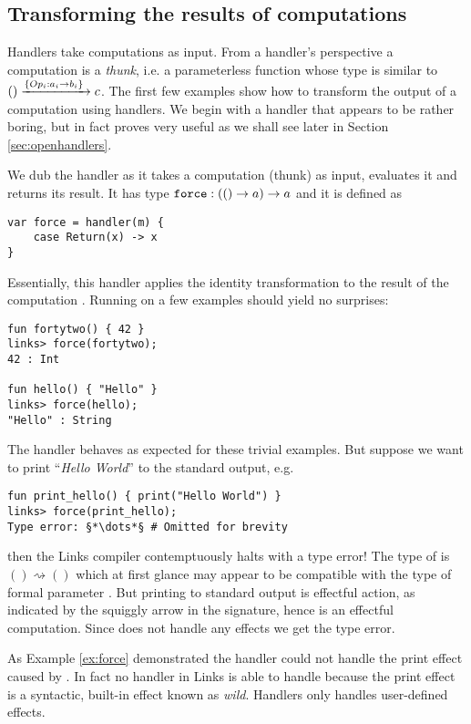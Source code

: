\subsection{Transforming the results of computations}\label{sec:transform}
Handlers take computations as input. From a handler's perspective a computation is a \emph{thunk}, i.e. a parameterless function whose type is similar to $() \xrightarrow{\left\{Op_i:a_i \to b_i \right\}\;} c$. The first few examples show how to transform the output of a computation using handlers. We begin with a handler that appears to be rather boring, but in fact proves very useful as we shall see later in Section \ref{sec:openhandlers}.
\begin{example}\label{ex:force}
We dub the handler  as it takes a computation (thunk) as input, evaluates it and returns its result. It has type $\texttt{force} : (() \to a) \to a$ and it is defined as
\begin{lstlisting}[style=links]
var force = handler(m) {
    case Return(x) -> x
}
\end{lstlisting}
Essentially, this handler applies the identity transformation to the result of the computation . Running  on a few examples should yield no surprises:
\begin{lstlisting}[style=links]
fun fortytwo() { 42 }
links> force(fortytwo);
42 : Int

fun hello() { "Hello" }
links> force(hello);
"Hello" : String
\end{lstlisting}
The handler  behaves as expected for these trivial examples. But suppose we want to print ``\emph{Hello World}'' to the standard output, e.g.
\begin{lstlisting}
fun print_hello() { print("Hello World") }
links> force(print_hello);
Type error: §*\dots*§ # Omitted for brevity
\end{lstlisting}
then the Links compiler contemptuously halts with a type error! The type of  is $() \rightsquigarrow ()$ which at first glance may appear to be compatible with the type of formal parameter . But printing to standard output is effectful action, as indicated by the squiggly arrow in the signature, hence  is an effectful computation. Since  does not handle any effects we get the type error. 
\end{example}
As Example \ref{ex:force} demonstrated the handler  could not handle the print effect caused by . In fact no handler in Links is able to handle  because the print effect is a syntactic, built-in effect known as \emph{wild}. Handlers only handles user-defined effects.

